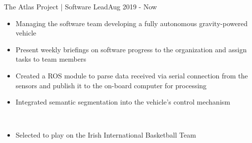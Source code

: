 
\begin{projects}

    \extracurricular
    {The Atlas Project | Software Lead}{Aug 2019 - Now}
    {
	    \begin{itemize}
    	    \item Managing the software team developing a fully autonomous gravity-powered vehicle
    	    \item Present weekly briefings on software progress to the organization and assign tasks to team members
    	    \item Created a ROS module to parse data received via serial connection from the sensors and publish it to the on-board computer for processing
    	    \item Integrated semantic segmentation into the vehicle's control mechanism
		\end{itemize}
    }
	\\

	\smallskip

    {
    \begin{itemize}
        \item Selected to play on the Irish International Basketball Team
    \end{itemize}
    }

\end{projects}
